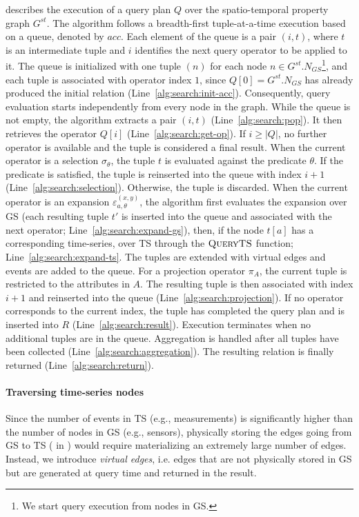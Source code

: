  describes the execution of a query plan $Q$ over the spatio-temporal property graph $G^{st}$.
The algorithm follows a breadth-first tuple-at-a-time execution based on a queue, denoted by $acc$.
Each element of the queue is a pair $(i,t)$, where $t$ is an intermediate tuple and $i$ identifies the next query operator to be applied to it.
The queue is initialized with one tuple $(n)$ for each node $n \in G^{st}.N_{GS}$\footnote{We start query execution from nodes in GS.}, and each tuple is associated with operator index $1$, since $Q[0]=G^{st}.N_{GS}$ has already produced the initial relation (Line~\ref{alg:search:init-acc}).
Consequently, query evaluation starts independently from every node in the graph.
While the queue is not empty, the algorithm extracts a pair $(i,t)$ (Line~\ref{alg:search:pop}).
It then retrieves the operator $Q[i]$ (Line~\ref{alg:search:get-op}).
If $i \geq |Q|$, no further operator is available and the tuple is considered a final result.
When the current operator is a selection $\sigma_\theta$, the tuple $t$ is evaluated against the predicate $\theta$.
If the predicate is satisfied, the tuple is reinserted into the queue with index $i+1$ (Line~\ref{alg:search:selection}).
Otherwise, the tuple is discarded.
When the current operator is an expansion $\varepsilon_{a,\theta}^{(x,y)}$, the algorithm first evaluates the expansion over GS (each resulting tuple $t'$ is inserted into the queue and associated with the next operator; Line~\ref{alg:search:expand-gs}), then, if the node $t[a]$ has a corresponding time-series, over TS through the $\textsc{QueryTS}$ function; Line~\ref{alg:search:expand-ts}.
The tuples are extended with virtual edges and events are added to the queue.
For a projection operator $\pi_A$, the current tuple is restricted to the attributes in $A$.
The resulting tuple is then associated with index $i+1$ and reinserted into the queue (Line~\ref{alg:search:projection}).
If no operator corresponds to the current index, the tuple has completed the query plan and is inserted into $R$ (Line~\ref{alg:search:result}).
Execution terminates when no additional tuples are in the queue.
Aggregation is handled after all tuples have been collected (Line~\ref{alg:search:aggregation}).
The resulting relation is finally returned (Line~\ref{alg:search:return}).

\paragraph{Traversing time-series nodes}
Since the number of events in TS (e.g., measurements) is significantly higher than the number of nodes in GS (e.g., sensors), physically storing the edges going from GS to TS ( in ) would require materializing an extremely large number of edges.
Instead, we introduce \textit{virtual edges}, i.e. edges that are not physically stored in GS but are generated at query time and returned in the result.

